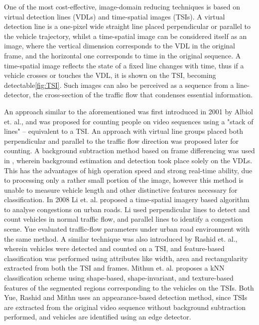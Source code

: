 One of the most cost-effective, image-domain reducing techniques is based on virtual detection lines (VDLs) and time-spatial images (TSIs).
A virtual detection line is a one-pixel wide straight line placed perpendicular or parallel to the vehicle trajectory, whilst a time-spatial image can be considered itself as an image, where the vertical dimension corresponds to the VDL in the original frame, and the horizontal one corresponds to time in the original sequence.
A time-spatial image reflects the state of a fixed line changes with time, thus if a vehicle crosses or touches the VDL, it is shown on the TSI, becoming detectable\ref{fig:TSI}.
Such images can also be perceived as a sequence from a line-detector, the cross-section of the traffic flow that condenses essential information. 

An approach similar to the aforementioned was first introduced in 2001 by Albiol et. al., and was proposed for counting people on video sequences using a "stack of lines" -- equivalent to a TSI\cite{Albiol2001}.
An approach with virtual line groups placed both perpendicular and parallel to the traffic flow direction was proposed later for counting\cite{Anan2006,Wu2007}.
A background subtraction method based on frame differencing was used in \cite{Anan2006, Wu2007}, wherein background estimation and detection took place solely on the VDLs.
This has the advantages of high operation speed and strong real-time ability, due to processing only a rather small portion of the image, however this method is unable to measure vehicle length and other distinctive features necessary for classification.
In 2008 Li et. al. proposed a time-spatial imagery based algorithm to analyse congestions on urban roads.
Li used perpendicular lines to detect and count vehicles in normal traffic flow, and parallel lines to identify a congestion scene\cite{Li2008}.
Yue evaluated traffic-flow parameters under urban road environment with the same method\cite{Yue2009}.
A similar technique was also introduced by Rashid et. al., wherein vehicles were detected and counted on a TSI, and feature-based classification was performed using attributes like width, area and rectangularity extracted from both the TSI and frames\cite{Rashid2010}.
Mithun et. al. proposes a kNN classification scheme using shape-based, shape-invariant, and texture-based features of the segmented regions corresponding to the vehicles on the TSIs\cite{Mithun2012a}.
Both Yue, Rashid and Mithn uses an appearance-based detection method, since TSIs are extracted from the original video sequence without background subtraction performed, and vehicles are identified using an edge detector.

